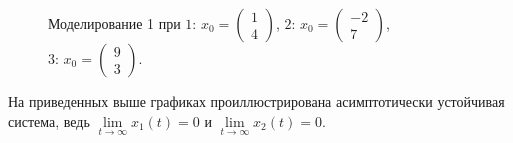 \documentclass[a5paper, 10pt]{article}
\theoremstyle{definition}
\theoremstyle{plain}
\theoremstyle{remark}
\begin{document}
\begin{figure}[h!]
\caption{Моделирование 1 при $1: \, x_0 = \begin{pmatrix} 1 \\ 4 \end{pmatrix}$, $2: \, x_0 = \begin{pmatrix} -2 \\ 7 \end{pmatrix}$, $3: \, x_0 = \begin{pmatrix} 9 \\ 3 \end{pmatrix}$.}
\end{figure}
\newpage
На приведенных выше графиках проиллюстрирована асимптотически устойчивая система, ведь $\lim \limits_{t \to \infty} x_1 (t) = 0$ и $\lim \limits_{t \to \infty} x_2 (t) = 0$.


\newpage
\end{document}
